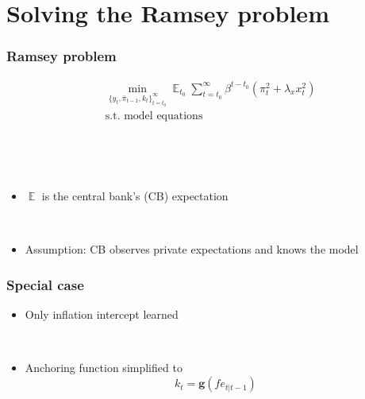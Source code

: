 \documentclass[11pt]{beamer}
\DeclareMathOperator{\E}{\mathbb{E}}
\begin{document}
\section{Solving the Ramsey problem}

\begin{frame}
	\frametitle{Ramsey problem}
	 \begin{align*}
& \min_{ \{y_t, \bar{\pi}_{t-1}, k_t \}_{t=t_0}^{\infty}} \E_{t_0}\sum_{t=t_0}^{\infty} \beta^{t-t_0} (\pi_t^2  + \lambda_x x_t^2 )  \\
& \text{s.t. model equations}
\end{align*}

\

\

\begin{itemize}
\item $\E$ is the central bank's (CB) expectation

\

\item Assumption: CB observes private expectations and knows the model
\end{itemize}

 

\end{frame}

\begin{frame}
	\frametitle{Special case}
	\label{special_case}

\begin{itemize}
\item Only inflation intercept learned

\

\item Anchoring function simplified to 
\begin{equation}
k_t = \mathbf{g}(fe_{t|t-1}) \label{gain_simple}
\end{equation}
\end{itemize}



\end{frame}
\end{document}
